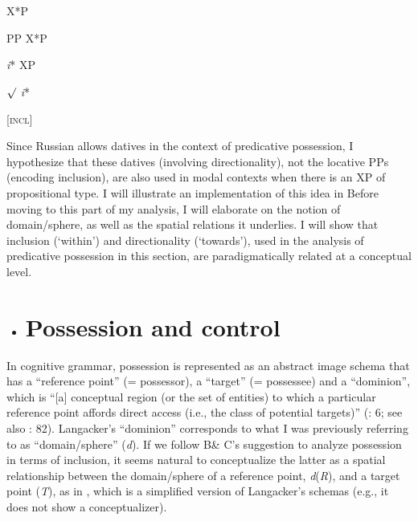 \documentclass[output=paper,modfonts,nonflat]{langsci/langscibook}
\begin{document}
\ea%
    \label{ex:key:27}
    \gll\\
        \\
    \glt
    \z

          X*P

  PP  X*P

  \textit{i}*  XP

   ${\surd}$   \textit{i}*

  [\textsc{incl}]

Since Russian allows datives in the context of predicative possession, I hypothesize that these datives (involving directionality), not the locative PPs (encoding inclusion), are also used in modal contexts when there is an XP of propositional type. I will illustrate an implementation of this idea in  Before moving to this part of my analysis, I will elaborate on the notion of domain/sphere, as well as the spatial relations it underlies. I will show that inclusion (‘within’) and directionality (‘towards’), used in the analysis of predicative possession in this section, are paradigmatically related at a conceptual level. 

\begin{itemize}
\item \section{Possession and control} 
\end{itemize}

In cognitive grammar, possession is represented as an abstract image schema that has a “reference point” (= possessor), a “target” (= possessee) and a “dominion”, which is “[a] conceptual region (or the set of entities) to which a particular reference point affords direct access (i.e., the class of potential targets)” (\citealt{Langacker1993}: 6; see also \citealt{Langacker2009}: 82). Langacker’s “dominion” corresponds to what I was previously referring to as “domain/sphere” (\textit{d}). If we follow B\& C’s suggestion to analyze possession in terms of inclusion, it seems natural to conceptualize the latter as a spatial relationship between the domain/sphere of a reference point, \textit{d}(\textit{R}), and a target point (\textit{T}), as in , which is a simplified version of Langacker’s schemas (e.g., it does not show a conceptualizer).

\end{document}

